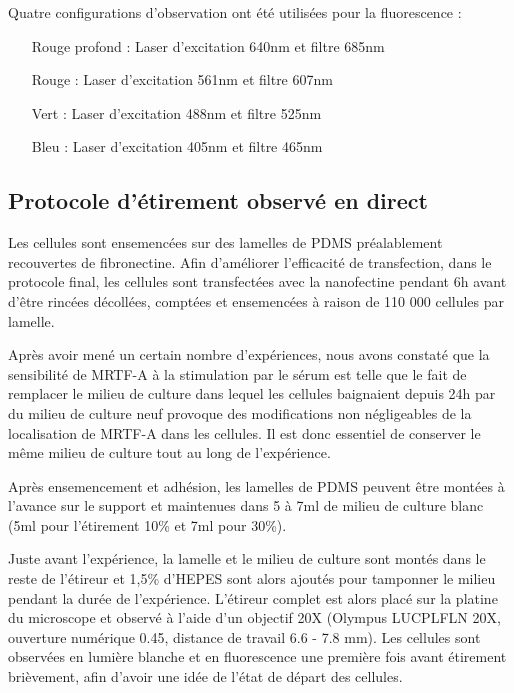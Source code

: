Quatre configurations d'observation ont été utilisées pour la fluorescence : 
\begin{itemize}
\item[Rouge profond] : Laser d'excitation 640nm et filtre 685nm
\item[Rouge] : Laser d'excitation 561nm et filtre 607nm
\item[Vert] : Laser d'excitation 488nm et filtre 525nm
\item[Bleu] : Laser d'excitation 405nm et filtre 465nm
\end{itemize}
	
	\subsection{Protocole d'étirement observé en direct}
	Les cellules sont ensemencées sur des lamelles de PDMS préalablement recouvertes de fibronectine. Afin d'améliorer l'efficacité de transfection, dans le protocole final, les cellules sont transfectées avec la nanofectine pendant 6h avant d'être rincées décollées, comptées et ensemencées à raison de 110 000 cellules par lamelle. 
	
	Après avoir mené un certain nombre d'expériences, nous avons constaté que la sensibilité de MRTF-A à la stimulation par le sérum est telle que le fait de remplacer le milieu de culture dans lequel les cellules baignaient depuis 24h par du milieu de culture neuf provoque des modifications non négligeables de la localisation de MRTF-A dans les cellules. Il est donc essentiel de conserver le même milieu de culture tout au long de l'expérience. 
	
	Après ensemencement et adhésion, les lamelles de PDMS peuvent être montées à l'avance sur le support et maintenues dans 5 à 7ml de milieu de culture blanc (5ml pour l'étirement 10\% et 7ml pour 30\%). 
	
	Juste avant l'expérience, la lamelle et le milieu de culture sont montés dans le reste de l'étireur et 1,5\% d'HEPES sont alors ajoutés pour tamponner le milieu pendant la durée de l'expérience. L'étireur complet est alors placé sur la platine du microscope et observé à l'aide d'un objectif 20X (Olympus LUCPLFLN 20X, ouverture numérique 0.45, distance de travail 6.6 - 7.8 mm). Les cellules sont observées en lumière blanche et en fluorescence une première fois avant étirement brièvement, afin d'avoir une idée de l'état de départ des cellules. 
	

